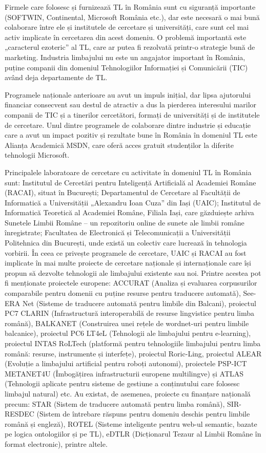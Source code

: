 \begin{multicols}{2}
Firmele care folosesc și furnizează TL în România sunt cu siguranță importante (SOFTWIN, Continental, Microsoft România etc.), dar este necesară o mai bună colaborare între ele și institutele de cercetare și universități, care sunt cel mai activ implicate în cercetarea din acest domeniu. O problemă importantă este „caracterul ezoteric” al TL, care ar putea fi rezolvată \mbox{printr-o} strategie bună de marketing. Industria limbajului nu este un angajator important în România, puține companii din domeniul Tehnologiilor Informației și Comunicării (TIC) având deja departamente de TL.

Programele naționale anterioare au avut un impuls inițial, dar lipsa ajutorului financiar consecvent sau destul de atractiv a dus la pierderea interesului marilor companii de TIC și a tinerilor cercetători, formați de universități și de institutele de cercetare. Unul dintre programele de colaborare dintre industrie și educație care a avut un impact pozitiv și rezultate bune în România în domeniul TL este Alianța Academică MSDN, care oferă acces gratuit studenților la diferite tehnologii Microsoft. 

Principalele laboratoare de cercetare cu activitate în domeniul TL în România sunt: Institutul de Cercetări pentru Inteligență Artificială al Academiei Române (RACAI), situat în București; Departamentul de Cercetare al Facultății de Informatică a Universității „Alexandru Ioan Cuza” din Iași (UAIC); Institutul de Informatică Teoretică al Academiei Române, Filiala Iași, care găzduiește arhiva Sunetele Limbii Române -- un repozitoriu online de sunete ale limbii române înregistrate; Facultatea de Electronică și Telecomunicații a Universității Politehnica din București, unde există un colectiv care lucrează în tehnologia vorbirii. În ceea ce privește programele de cercetare, UAIC și RACAI au fost implicate în mai multe proiecte de cercetare naționale și internaționale care își propun să dezvolte tehnologii ale limbajului existente sau noi. Printre acestea pot fi menționate proiectele europene: ACCURAT (Analiza și evaluarea corpusurilor comparabile pentru domenii cu puține resurse pentru traducere automată), See-ERA Net (Sisteme de traducere automată pentru limbile din Balcani), proiectul PC7 CLARIN (Infrastructură interoperabilă de resurse lingvistice pentru limba română), BALKANET (Construirea unei rețele de wordnet-uri pentru limbile balcanice), proiectul PC6 LT4eL (Tehnologii ale limbajului pentru \mbox{e-learning}), proiectul INTAS RoLTech (platformă pentru tehnologiile limbajului pentru limba română: resurse, instrumente și interfețe), proiectul Roric-Ling, proiectul ALEAR (Evoluție a limbajului artificial pentru roboți autonomi), proiectele PSP-ICT METANET4U (Îmbogățirea infrastructurii europene multilingve) și ATLAS (Tehnologii aplicate pentru sisteme de gestiune a conținutului care folosesc limbajul natural) etc. Au existat, de asemenea, proiecte cu finanțare națională precum: STAR (Sistem de traducere automată pentru limba română), SIR-RESDEC (Sistem de întrebare răspuns pentru domeniu deschis pentru limbile română și engleză), ROTEL (Sisteme inteligente pentru web-ul semantic, bazate pe logica ontologiilor și pe TL), eDTLR (Dicționarul Tezaur al Limbii Române în format electronic), printre altele.


\end{multicols}
